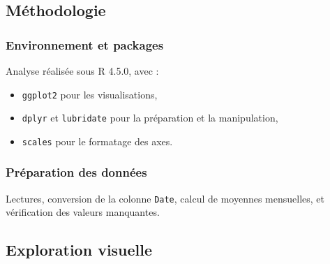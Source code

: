 \documentclass[12pt,a4paper]{article}
\begin{document}
\subsection{Méthodologie}
\subsubsection{Environnement et packages}
Analyse réalisée sous R 4.5.0, avec :
\begin{itemize}
  \item \texttt{ggplot2} pour les visualisations,
  \item \texttt{dplyr} et \texttt{lubridate} pour la préparation et la manipulation,
  \item \texttt{scales} pour le formatage des axes.
\end{itemize}

\subsubsection{Préparation des données}
Lectures, conversion de la colonne \texttt{Date}, calcul de moyennes mensuelles, et vérification des valeurs manquantes.

\subsection{Exploration visuelle}
\end{document}
